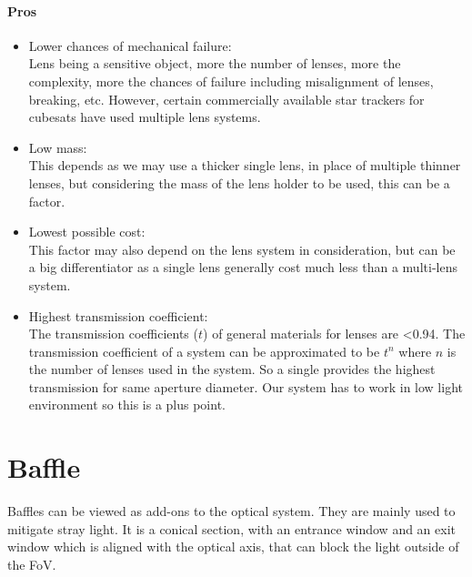 \paragraph{Pros}
\begin{itemize}
    \item Lower chances of mechanical failure:
    \\Lens being a sensitive object, more the number of lenses, more the complexity, more the chances of failure including misalignment of lenses, breaking, etc. However, certain commercially available star trackers for cubesats have used multiple lens systems.
    \item Low mass:
    \\This depends as we may use a thicker single lens, in place of multiple thinner lenses, but considering the mass of the lens holder to be used, this can be a factor.
    \item Lowest possible cost:
    \\This factor may also depend on the lens system in consideration, but can be a big differentiator as a single lens generally cost much less than a multi-lens system.
    \item Highest transmission coefficient:
    \\The transmission coefficients ($t$) of general materials for lenses are \textless 0.94. The transmission coefficient of a system can be approximated to be $t^n$ where $n$ is the number of lenses used in the system. So a single provides the highest transmission for same aperture diameter. Our system has to work in low light environment so this is a plus point.
\end{itemize}


\section{Baffle}
Baffles can be viewed as add-ons to the optical system. They are mainly used to mitigate stray light. It is a conical section, with an entrance window and an exit window which is aligned with the optical axis, that can block the light outside of the FoV.

